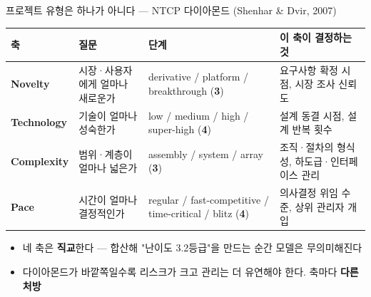 \begin{frame}[allowframebreaks=1.0]{프로젝트 유형은 하나가 아니다 — NTCP 다이아몬드 (Shenhar \& Dvir, 2007)}
\small
{\footnotesize\setlength{\tabcolsep}{3pt}\renewcommand{\arraystretch}{1.12}
\begin{tabular}{@{}>{\raggedright\arraybackslash}p{}>{\raggedright\arraybackslash}p{}>{\raggedright\arraybackslash}p{}>{\raggedright\arraybackslash}p{}@{}}
\toprule
\textbf{축} & \textbf{질문} & \textbf{단계} & \textbf{이 축이 결정하는 것} \\
\midrule
\textbf{Novelty} & 시장·사용자에게 얼마나 새로운가 & derivative / platform / breakthrough (\textbf{3}) & 요구사항 확정 시점, 시장 조사 신뢰도 \\
\textbf{Technology} & 기술이 얼마나 성숙한가 & low / medium / high / super-high (\textbf{4}) & 설계 동결 시점, 설계 반복 횟수 \\
\textbf{Complexity} & 범위·계층이 얼마나 넓은가 & assembly / system / array (\textbf{3}) & 조직·절차의 형식성, 하도급·인터페이스 관리 \\
\textbf{Pace} & 시간이 얼마나 결정적인가 & regular / fast-competitive / time-critical / blitz (\textbf{4}) & 의사결정 위임 수준, 상위 관리자 개입 \\
\bottomrule
\end{tabular}}
\par\smallskip
\begin{itemize}
\item\relax 네 축은 \textbf{직교}한다 — 합산해 "난이도 3.2등급"을 만드는 순간 모델은 무의미해진다
\item\relax 다이아몬드가 바깥쪽일수록 리스크가 크고 관리는 더 유연해야 한다. 축마다 \textbf{다른 처방}
\end{itemize}
\end{frame}

